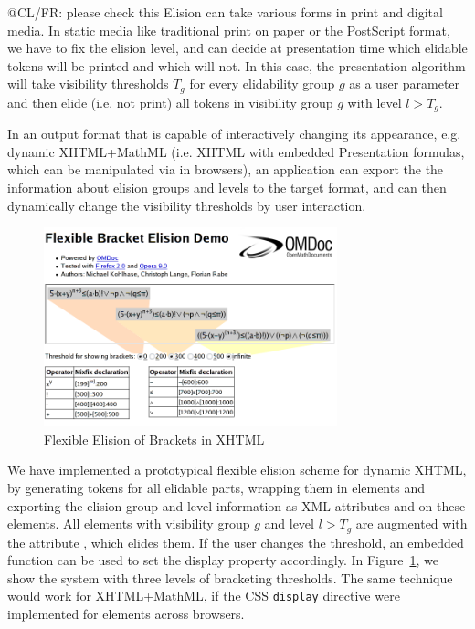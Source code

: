 \begin{newpart}{@CL/FR: please check this}
  Elision can take various forms in print and digital media. In static media like
  traditional print on paper or the PostScript format, we have to fix the elision level, and
  can decide at presentation time which elidable tokens will be printed and which will
  not. In this case, the presentation algorithm will take visibility thresholds $T_g$ for
  every elidability group $g$ as a user parameter and then elide (i.e. not print) all
  tokens in visibility group $g$ with level $l>T_g$.

  In an output format that is capable of interactively changing its appearance, e.g.
  dynamic XHTML+MathML (i.e. XHTML with embedded Presentation {\mathml} formulas, which
  can be manipulated via {\javascript} in browsers), an application can export the the
  information about elision groups and levels to the target format, and can then
  dynamically change the visibility thresholds by user interaction.

\begin{figure}[ht]\centering
    \includegraphics[width=8.5cm]{demo-shot}
    \caption{Flexible Elision of Brackets in XHTML}
    \label{fig:flexible-elision}\vspace*{-.5cm}
\end{figure}
  We have implemented a prototypical flexible elision scheme for dynamic XHTML, by
  generating tokens for all elidable parts, wrapping them in
  {} elements and exporting the elision group and level
  information as XML attributes {} and
  {} on these elements. All
  {} elements with visibility group $g$ and level $l>T_g$ are
  augmented with the attribute {}, which elides them. If the
  user changes the threshold, an embedded {\javascript} function can be used to set the
  display property accordingly. In Figure~\ref{fig:flexible-elision}, we show the system
  with three levels of bracketing thresholds. The same technique would work for
  XHTML+MathML, if the CSS {\tt{display}} directive were implemented for {\mathml}
  elements across browsers. 
\end{newpart}




